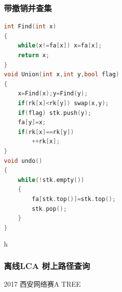 \documentclass[UTF8,a4paper,titlepage]{ctexart}
\begin{document}
\subsubsection*{带撤销并查集}
\begin{lstlisting}[language=C++]
int Find(int x)
{
    while(x!=fa[x]) x=fa[x];
    return x;
}
void Union(int x,int y,bool flag)
{
    x=Find(x);y=Find(y);
    if(rk[x]<rk[y]) swap(x,y);
    if(flag) stk.push(y);
    fa[y]=x;
    if(rk[x]==rk[y])
        ++rk[x];
}
void undo()
{
    while(!stk.empty())
    {
        fa[stk.top()]=stk.top();
        stk.pop();
    }
}
    \end{lstlisting}
h   \subsubsection*{离线LCA 树上路径查询}
2017 西安网络赛A TREE
\end{document}
